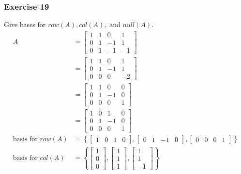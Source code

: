 \documentclass[letterpaper, 12pt]{math}
\begin{document}
\subsubsection*{Exercise 19}
Give bases for \( row(A), col(A), \text{ and } null(A) \).
\begin{align*}
  A &= \begin{bmatrix}
    1 & 1 & 0 & 1 \\
    0 & 1 & -1 & 1 \\
    0 & 1 & -1 & -1
  \end{bmatrix} \\
  &= \begin{bmatrix}
    1 & 1 & 0 & 1 \\
    0 & 1 & -1 & 1 \\
    0 & 0 & 0 & -2
  \end{bmatrix} \\
  &= \begin{bmatrix}
    1 & 1 & 0 & 0 \\
    0 & 1 & -1 & 0 \\
    0 & 0 & 0 & 1
  \end{bmatrix} \\
  &= \begin{bmatrix}
    1 & 0 & 1 & 0 \\
    0 & 1 & -1 & 0 \\
    0 & 0 & 0 & 1
  \end{bmatrix} \\
  \text{basis for } row(A) &= \left\{\begin{bmatrix}
    1 & 0 & 1 & 0
  \end{bmatrix},\begin{bmatrix}
    0 & 1 & -1 & 0
  \end{bmatrix},\begin{bmatrix}
    0 & 0 & 0 & 1
  \end{bmatrix}\right\} \\
  \text{basis for } col(A) &= \left\{\begin{bmatrix}
    1 \\ 0 \\ 0
  \end{bmatrix},\begin{bmatrix}
    1 \\ 1 \\ 1
  \end{bmatrix},\begin{bmatrix}
    1 \\ 1 \\ -1
  \end{bmatrix}\right\} \\

\end{align*}
\end{document}
